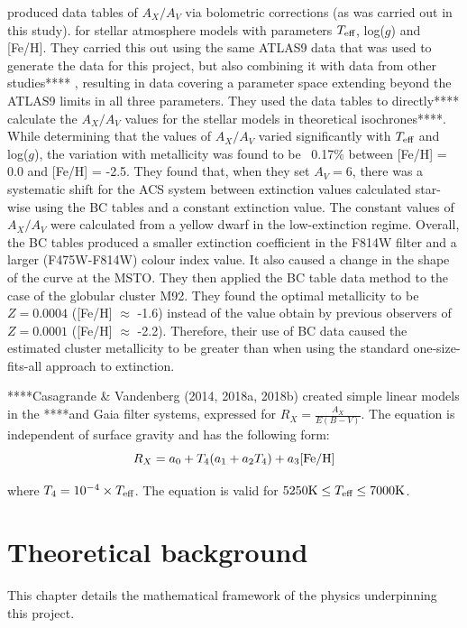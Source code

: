 \documentclass[12pt, a4paper]{report}
\begin{document}
\cite{2008PASP..120..583G} produced data tables of $A_{X}/A_{V}$ via bolometric corrections (as was carried out in this study). for stellar atmosphere models with parameters $T_{\textnormal{eff}}$, log($g$) and [Fe/H]. They carried this out using the same ATLAS9 data \cite{2004astro.ph..5087C} that was used to generate the data for this project, but also combining it with data from other studies**** \cite{2002A&A...391..195G}, resulting in data covering a parameter space extending beyond the ATLAS9 limits in all three parameters. They used the data tables to directly**** calculate the $A_{X}/A_{V}$ values for the stellar models in theoretical isochrones****. While determining that the values of $A_{X}/A_{V}$ varied significantly with $T_{\textnormal{eff}}$ and log($g$), the variation with metallicity was found to be ~0.17$\%$ between [Fe/H] = 0.0 and [Fe/H] = -2.5. They found that, when they set $A_{V} = 6$, there was a systematic shift for the ACS system between extinction values calculated star-wise using the BC tables and a constant extinction value. The constant values of $A_{X}/A_{V}$ were calculated from a yellow dwarf in the low-extinction regime. Overall, the BC tables produced a smaller extinction coefficient in the F814W filter and a larger (F475W-F814W) colour index value. It also caused a change in the shape of the curve at the MSTO. They then applied the BC table data method to the case of the globular cluster M92. They found the optimal metallicity to be $Z = 0.0004$ ([Fe/H] $\approx$ -1.6) instead of the value obtain by previous observers of $Z = 0.0001$ ([Fe/H] $\approx$ -2.2). Therefore, their use of BC data caused the estimated cluster metallicity to be greater than when using the standard one-size-fits-all approach to extinction.

****Casagrande \& Vandenberg (2014, 2018a, 2018b) created simple linear models in the ****and Gaia filter systems, expressed for $R_{X}  = \frac{A_{X}}{E(B-V)}$. The equation is independent of surface gravity and has the following form:
\begin{equation}
R_{X}  = a_{0} + T_{4}(a_{1} + a_{2}T_{4}) + a_{3}\textnormal{[Fe/H]}
\label{casagrande_ext_fit}
\end{equation}

where $T_{4} = 10^{-4} \times T_{\textnormal{eff}}$. The equation is valid for $5250\textnormal{K} \leq T_{\textnormal{eff}} \leq 7000\textnormal{K}$.

\chapter{Theoretical background}
This chapter details the mathematical framework of the physics underpinning this project.
\end{document}
